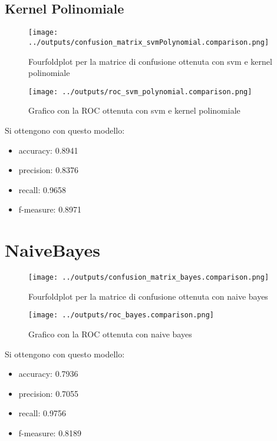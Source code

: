 \subsection{Kernel Polinomiale}
\begin{figure}[H]
    \centering
    \texttt{[image: ../outputs/confusion\_matrix\_svmPolynomial.comparison.png]}
    \caption{Fourfoldplot per la matrice di confusione ottenuta con svm e kernel polinomiale}
\end{figure}
\begin{figure}[H]
    \centering
    \texttt{[image: ../outputs/roc\_svm\_polynomial.comparison.png]}
    \caption{Grafico con la ROC ottenuta con svm e kernel polinomiale}
\end{figure}
Si ottengono con questo modello:
\begin{itemize}
    \item accuracy: 0.8941 
    \item precision: 0.8376  
    \item recall: 0.9658 
    \item f-measure: 0.8971
\end{itemize}
\section{NaiveBayes}
\begin{figure}[H]
    \centering
    \texttt{[image: ../outputs/confusion\_matrix\_bayes.comparison.png]}
    \caption{Fourfoldplot per la matrice di confusione ottenuta con naive bayes}
\end{figure}
\begin{figure}[H]
    \centering
    \texttt{[image: ../outputs/roc\_bayes.comparison.png]}
    \caption{Grafico con la ROC ottenuta con naive bayes}
\end{figure}
Si ottengono con questo modello:
\begin{itemize}
    \item accuracy: 0.7936
    \item precision: 0.7055
    \item recall: 0.9756
    \item f-measure: 0.8189
\end{itemize}


